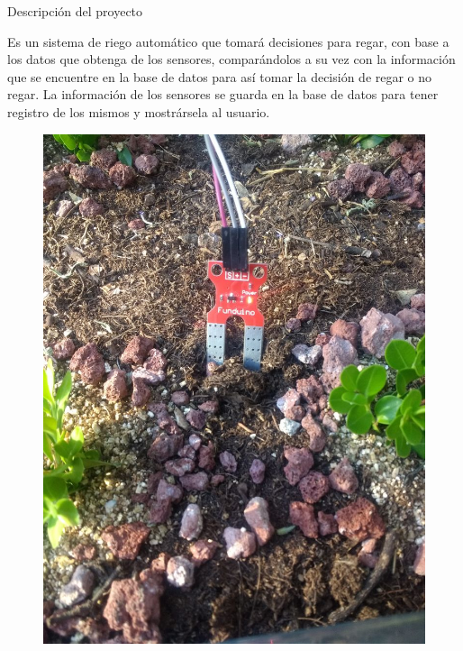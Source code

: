 \documentclass{beamer}
\begin{document}
\begin{frame}[fragile]{}
\begin{columns}[t]
\begin{column}{0.46\linewidth}
\begin{block}{Descripción del proyecto}
	 	
Es un sistema de riego automático que tomará decisiones para regar, con base a los datos que obtenga de los sensores, comparándolos a su vez con la información que se encuentre en la base de datos para así tomar la decisión de regar o no regar. La información de los sensores se guarda en la base de datos para tener registro de los mismos y mostrársela al usuario.
\begin{figure}[H]
	\centering
	\includegraphics[scale=0.5]{../graphics/s2}
\end{figure}
	 	 
	 	\end{block}
	 \end{column}
	\end{columns}
 
 	\justifying
 	\begin{columns}[t]
 

\end{columns}
\end{frame}
\end{document}
